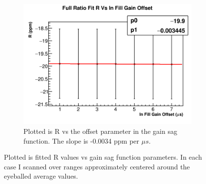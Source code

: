 \begin{figure}[]
		    \vspace{4mm}
		    \begin{subfigure}[t]{0.45\textwidth}
			    \centering
				\includegraphics[width=\textwidth]{RatioCBO_R_Vs_InFillGainOffset_Canv}
			    \caption{Plotted is R vs the offset parameter in the gain sag function. The slope is -0.0034 ppm per $\mu s$.}
		    \end{subfigure}%
		\caption[InFillGain]{Plotted is fitted R values vs gain sag function parameters. In each case I scanned over ranges approximately centered around the eyeballed average values.}
		\label{Fig:InFillGain}
		\end{figure}


